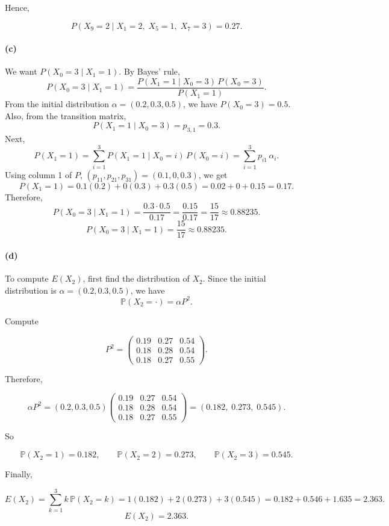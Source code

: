 \documentclass[hidelinks]{article}
\begin{document}
\noindent Hence,

\[
\boxed{P(X_9=2 \mid X_1=2,\; X_5=1,\; X_7=3)=0.27.}
\]

\paragraph{(c)}
We want $P(X_0=3 \mid X_1=1)$. By Bayes' rule,
\[
P(X_0=3 \mid X_1=1)=\frac{P(X_1=1 \mid X_0=3)\,P(X_0=3)}{P(X_1=1)}.
\]
From the initial distribution $\alpha=(0.2,0.3,0.5)$, we have $P(X_0=3)=0.5$.
Also, from the transition matrix,
\[
P(X_1=1 \mid X_0=3)=p_{3,1}=0.3.
\]
Next,
\[
P(X_1=1)=\sum_{i=1}^3 P(X_1=1 \mid X_0=i)\,P(X_0=i)
=\sum_{i=1}^3 p_{i1}\,\alpha_i.
\]
Using column 1 of $P$, $(p_{11},p_{21},p_{31})=(0.1,0,0.3)$, we get
\[
P(X_1=1)=0.1(0.2)+0(0.3)+0.3(0.5)=0.02+0+0.15=0.17.
\]
Therefore,
\[
P(X_0=3 \mid X_1=1)=\frac{0.3\cdot 0.5}{0.17}=\frac{0.15}{0.17}
=\frac{15}{17}\approx 0.88235.
\]
\[
\boxed{P(X_0=3 \mid X_1=1)=\frac{15}{17}\approx 0.88235.}
\]

\paragraph{(d)}

To compute $E(X_2)$, first find the distribution of $X_2$.
Since the initial distribution is $\alpha=(0.2,0.3,0.5)$, we have
\[
\mathbb{P}(X_2=\cdot)=\alpha P^2.
\]

\noindent Compute

\[
P^2=
\begin{pmatrix}
0.19 & 0.27 & 0.54\\
0.18 & 0.28 & 0.54\\
0.18 & 0.27 & 0.55
\end{pmatrix}.
\]

\noindent Therefore,

\[
\alpha P^2
=
(0.2,0.3,0.5)
\begin{pmatrix}
0.19 & 0.27 & 0.54\\
0.18 & 0.28 & 0.54\\
0.18 & 0.27 & 0.55
\end{pmatrix}
=
(0.182,\;0.273,\;0.545).
\]

\noindent So

\[
\mathbb{P}(X_2=1)=0.182,\qquad \mathbb{P}(X_2=2)=0.273,\qquad \mathbb{P}(X_2=3)=0.545.
\]

\noindent Finally,

\[
E(X_2)=\sum_{k=1}^3 k\,\mathbb{P}(X_2=k)
=1(0.182)+2(0.273)+3(0.545)
=0.182+0.546+1.635
=2.363.
\]
\[
\boxed{E(X_2)=2.363.}
\]
\end{document}
